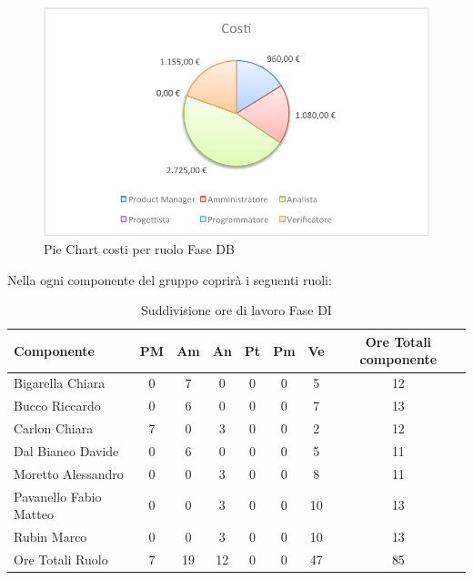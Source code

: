 				\begin{figure}[H]\centering
					\includegraphics[width=\textwidth]{PianoDiProgetto/Pics/ChartTotCostiFaseDB.pdf}
					\caption{Pie Chart costi per ruolo Fase DB}
				\end{figure}
				Nella  ogni componente del gruppo \groupname{} coprirà i seguenti ruoli:
				\begin{table}[H]
					\begin{center}
						\begin{tabular}{| l | c | c | c | c | c | c | c |}
							\hline
							Componente 					& PM	& Am 	& An 	& Pt 	& Pm 	& Ve 		& Ore Totali componente \\ \hline
							
							Bigarella Chiara 			& 0		& 7 	& 0		& 0		& 0		& 5 		& 12 \\
							Bucco Riccardo 				& 0		& 6 	& 0		& 0		& 0		& 7 		& 13 \\
							Carlon Chiara	 			& 7 	& 0		& 3 	& 0		& 0		& 2 		& 12 \\
							Dal Bianco Davide 			& 0		& 6 	& 0		& 0		& 0		& 5 		& 11 \\
							Moretto Alessandro 			& 0		& 0		& 3 	& 0		& 0		& 8 		& 11 \\
							Pavanello Fabio Matteo	 	& 0		& 0		& 3 	& 0		& 0		& 10 		& 13 \\
							Rubin Marco					& 0		& 0		& 3 	& 0		& 0		& 10 		& 13 \\ \hline \hline
							
							Ore Totali Ruolo 			& 7 	& 19 	& 12 	& 0		& 0		& 47 		& 85\\ \hline
						\end{tabular}
					\end{center}
					\caption{Suddivisione ore di lavoro Fase DI}
				\end{table}
